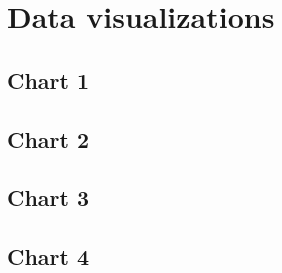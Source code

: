 \documentclass{article}
\begin{document}
\newpage

\section{Data visualizations}

\subsection{Chart 1}
\subsection{Chart 2}
\subsection{Chart 3}
\subsection{Chart 4}

\newpage
\end{document}
